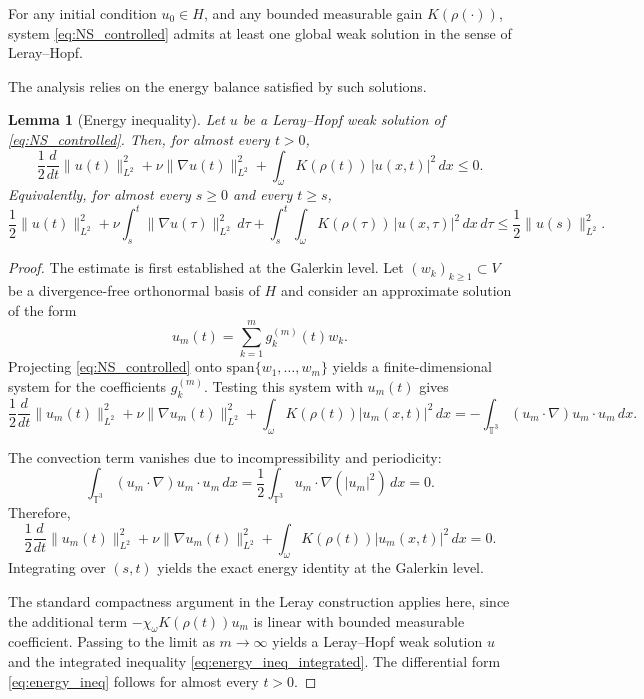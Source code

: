 \documentclass[preprint,12pt]{elsarticle}
\newtheorem{lemma}[theorem]{Lemma}
\begin{document}
For any initial condition $u_0\in H$, and any bounded measurable gain
$K(\rho(\cdot))$, system \eqref{eq:NS_controlled} admits at least one global
weak solution in the sense of Leray--Hopf.

The analysis relies on the energy balance satisfied by such solutions.

\begin{lemma}[Energy inequality]
\label{lem:energy_ineq}
Let $u$ be a Leray--Hopf weak solution of \eqref{eq:NS_controlled}.
Then, for almost every $t>0$,
\begin{equation}
\label{eq:energy_ineq}
\frac{1}{2}\frac{d}{dt}\|u(t)\|_{L^2}^2
+ \nu \|\nabla u(t)\|_{L^2}^2
+ \int_{\omega} K(\rho(t))\,|u(x,t)|^2\,dx
\le 0.
\end{equation}
Equivalently, for almost every $s\ge 0$ and every $t\ge s$,
\begin{equation}
\label{eq:energy_ineq_integrated}
\frac{1}{2}\|u(t)\|_{L^2}^2
+ \nu \int_s^t \|\nabla u(\tau)\|_{L^2}^2\,d\tau
+ \int_s^t \int_\omega K(\rho(\tau))\,|u(x,\tau)|^2\,dx\,d\tau
\le \frac{1}{2}\|u(s)\|_{L^2}^2.
\end{equation}
\end{lemma}

\begin{proof}
The estimate is first established at the Galerkin level.
Let $(w_k)_{k\ge1}\subset V$ be a divergence-free orthonormal basis of $H$ and
consider an approximate solution of the form
\[
u_m(t)=\sum_{k=1}^m g_k^{(m)}(t)w_k.
\]
Projecting \eqref{eq:NS_controlled} onto
$\mathrm{span}\{w_1,\dots,w_m\}$ yields a finite-dimensional system for the
coefficients $g_k^{(m)}$.
Testing this system with $u_m(t)$ gives
\[
\frac12\frac{d}{dt}\|u_m(t)\|_{L^2}^2
+\nu\|\nabla u_m(t)\|_{L^2}^2
+\int_\omega K(\rho(t))|u_m(x,t)|^2\,dx
=
-\int_{\mathbb{T}^3}(u_m\cdot\nabla)u_m\cdot u_m\,dx .
\]

The convection term vanishes due to incompressibility and periodicity:
\[
\int_{\mathbb{T}^3}(u_m\cdot\nabla)u_m\cdot u_m\,dx
=
\frac12\int_{\mathbb{T}^3}u_m\cdot\nabla(|u_m|^2)\,dx
=0.
\]
Therefore,
\[
\frac12\frac{d}{dt}\|u_m(t)\|_{L^2}^2
+\nu\|\nabla u_m(t)\|_{L^2}^2
+\int_\omega K(\rho(t))|u_m(x,t)|^2\,dx
=0.
\]
Integrating over $(s,t)$ yields the exact energy identity at the Galerkin level.

The standard compactness argument in the Leray construction applies here,
since the additional term
$-\chi_\omega K(\rho(t))u_m$ is linear with bounded measurable coefficient.
Passing to the limit as $m\to\infty$ yields a Leray--Hopf weak solution $u$ and
the integrated inequality \eqref{eq:energy_ineq_integrated}.
The differential form \eqref{eq:energy_ineq} follows for almost every $t>0$.
\end{proof}
\end{document}
